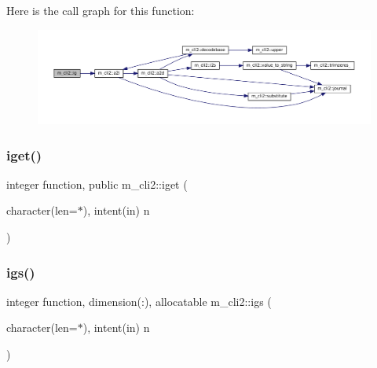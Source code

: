 Here is the call graph for this function\+:
\nopagebreak
\begin{figure}[H]
\begin{center}
\leavevmode
\includegraphics[width=350pt]{namespacem__cli2_a11c3cc864e613c90b2a02c7409c00828_cgraph}
\end{center}
\end{figure}
\mbox{\label{namespacem__cli2_a1b41630a5b78ed0fcb6b6df49ac7738d}} 
\subsubsection{\texorpdfstring{iget()}{iget()}}
{\footnotesize\ttfamily integer function, public m\+\_\+cli2\+::iget (\begin{DoxyParamCaption}\item[{character(len=$\ast$), intent(in)}]{n }\end{DoxyParamCaption})}

\mbox{\label{namespacem__cli2_a39e18c9b881ea554d6d0adee0f5a5313}} 
\subsubsection{\texorpdfstring{igs()}{igs()}}
{\footnotesize\ttfamily integer function, dimension(\+:), allocatable m\+\_\+cli2\+::igs (\begin{DoxyParamCaption}\item[{character(len=$\ast$), intent(in)}]{n }\end{DoxyParamCaption})\hspace{0.3cm}{\ttfamily [private]}}

\mbox{\label{namespacem__cli2_ab3f2aa827b3b7ff419bcdc3ccb2672b3}} 
